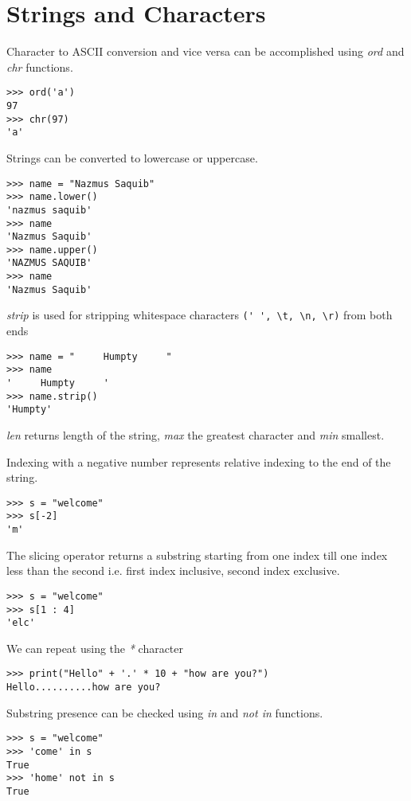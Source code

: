 \documentclass[a4paper, 12pt]{article}
\begin{document}
\section{Strings and Characters}
Character to ASCII conversion and vice versa can be accomplished using \emph{ord} and \emph{chr} functions.
\begin{verbatim}
>>> ord('a')
97
>>> chr(97)
'a'
\end{verbatim}

Strings can be converted to lowercase or uppercase.
\begin{verbatim}
>>> name = "Nazmus Saquib"
>>> name.lower()
'nazmus saquib'
>>> name
'Nazmus Saquib'
>>> name.upper()
'NAZMUS SAQUIB'
>>> name
'Nazmus Saquib'
\end{verbatim}

\emph{strip} is used for stripping whitespace characters \verb|(' ', \t, \n, \r)| from both ends
\begin{verbatim}
>>> name = "     Humpty     "
>>> name
'     Humpty     '
>>> name.strip()
'Humpty'
\end{verbatim}

\emph{len} returns length of the string, \emph{max} the greatest character and \emph{min} smallest.

Indexing with a negative number represents relative indexing to the end of the string.
\begin{verbatim}
>>> s = "welcome"
>>> s[-2]
'm'
\end{verbatim}

The slicing operator returns a substring starting from one index till one index less than the second i.e. first index inclusive, second index exclusive.
\begin{verbatim}
>>> s = "welcome"
>>> s[1 : 4]
'elc'
\end{verbatim}

We can repeat using the \emph{*} character
\begin{verbatim}
>>> print("Hello" + '.' * 10 + "how are you?")
Hello..........how are you?
\end{verbatim}

Substring presence can be checked using \emph{in} and \emph{not in} functions.
\begin{verbatim}
>>> s = "welcome"
>>> 'come' in s
True
>>> 'home' not in s
True
\end{verbatim}
\end{document}
